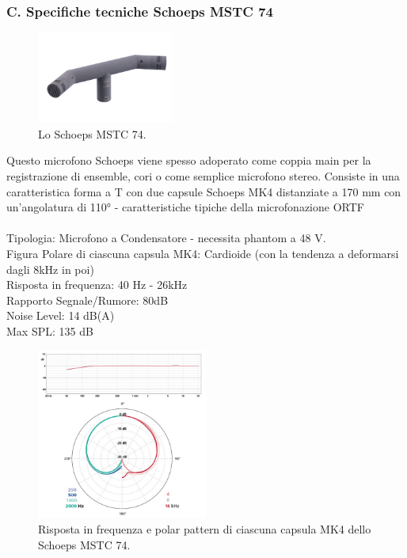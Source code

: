 \documentclass{article}
\begin{document}
\subsubsection{C. Specifiche tecniche Schoeps MSTC 74}
    \begin{figure}[H]
        \centering
        \includegraphics[width=0.4\textwidth]{images/MSTC74.jpeg}
        \caption{\label{fig6}Lo Schoeps MSTC 74.}
    \end{figure}
    
    Questo microfono Schoeps viene spesso adoperato come coppia main per la registrazione di ensemble, cori o come semplice microfono stereo. Consiste in una caratteristica forma a T con due capsule Schoeps MK4 distanziate a 170 mm con un'angolatura di 110° - caratteristiche tipiche della microfonazione ORTF\\\\
    Tipologia: Microfono a Condensatore - necessita phantom a 48 V.\\
    Figura Polare di ciascuna capsula MK4: Cardioide (con la tendenza a deformarsi dagli 8kHz in poi)\\
    Risposta in frequenza: 40 Hz - 26kHz\\
    Rapporto Segnale/Rumore: 80dB\\
    Noise Level: 14 dB(A)\\
    Max SPL: 135 dB
    
    \begin{figure}[H]
        \centering
        \includegraphics[width=0.5\textwidth]{images/PLOT_SCHOEPS.jpg}
        \caption{\label{fig7}Risposta in frequenza e polar pattern di ciascuna capsula MK4 dello Schoeps MSTC 74.}
    \end{figure}
\end{document}
